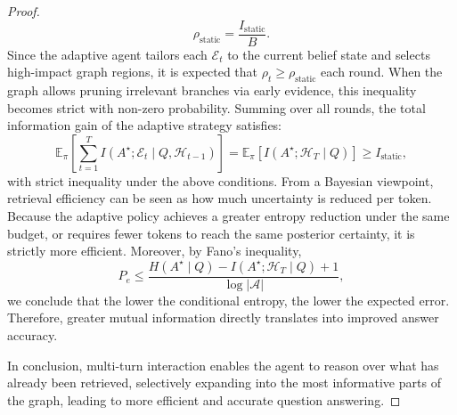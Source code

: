 \documentclass{article}
\theoremstyle{plain}
\theoremstyle{definition}
\theoremstyle{remark}
\begin{document}
\begin{proof}
\begin{equation}
\rho_{\mathrm{static}} = \frac{I_{\mathrm{static}}}{B}.
\end{equation}
Since the adaptive agent tailors each $\mathcal E_t$ to the current belief state and selects high-impact graph regions, it is expected that $\rho_t \ge \rho_{\mathrm{static}}$ each round. When the graph allows pruning irrelevant branches via early evidence, this inequality becomes strict with non-zero probability.
Summing over all rounds, the total information gain of the adaptive strategy satisfies:
\begin{equation}
\mathbb{E}_\pi \left[\sum_{t=1}^T I(A^\star; \mathcal E_t \mid Q, \mathcal H_{t-1})\right]
= \mathbb{E}_\pi \left[ I(A^\star; \mathcal H_T \mid Q) \right]
\ge I_{\mathrm{static}},
\end{equation}
with strict inequality under the above conditions.
From a Bayesian viewpoint, retrieval efficiency can be seen as how much uncertainty is reduced per token. Because the adaptive policy achieves a greater entropy reduction under the same budget, or requires fewer tokens to reach the same posterior certainty, it is strictly more efficient.
Moreover, by Fano’s inequality,
\begin{equation}
P_e \le \frac{H(A^\star \mid Q) - I(A^\star; \mathcal H_T \mid Q) + 1}{\log |\mathcal A|},
\end{equation}
we conclude that the lower the conditional entropy, the lower the expected error. Therefore, greater mutual information directly translates into improved answer accuracy.

In conclusion, multi-turn interaction enables the agent to reason over what has already been retrieved, selectively expanding into the most informative parts of the graph, leading to more efficient and accurate question answering.
\end{proof}
\end{document}
